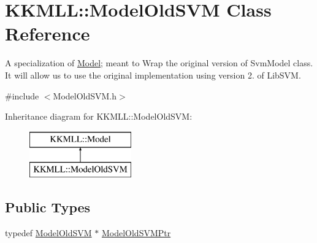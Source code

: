 \hypertarget{class_k_k_m_l_l_1_1_model_old_s_v_m}{}\section{K\+K\+M\+LL\+:\+:Model\+Old\+S\+VM Class Reference}
\label{class_k_k_m_l_l_1_1_model_old_s_v_m}


A specialization of \textquotesingle{}\hyperlink{class_k_k_m_l_l_1_1_model}{Model}\textquotesingle{}; meant to Wrap the original version of \textquotesingle{}Svm\+Model\textquotesingle{} class. It will allow us to use the original implementation using version 2. of Lib\+S\+VM.  




{\ttfamily \#include $<$Model\+Old\+S\+V\+M.\+h$>$}

Inheritance diagram for K\+K\+M\+LL\+:\+:Model\+Old\+S\+VM\+:\begin{figure}[H]
\begin{center}
\leavevmode
\includegraphics[height=2.000000cm]{class_k_k_m_l_l_1_1_model_old_s_v_m}
\end{center}
\end{figure}
\subsection*{Public Types}
\begin{DoxyCompactItemize}
\item 
typedef \hyperlink{class_k_k_m_l_l_1_1_model_old_s_v_m}{Model\+Old\+S\+VM} $\ast$ \hyperlink{class_k_k_m_l_l_1_1_model_old_s_v_m_a0ad9d6a95b826532145fd3778a396db4}{Model\+Old\+S\+V\+M\+Ptr}
\end{DoxyCompactItemize}
